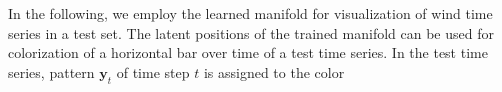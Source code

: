 \documentclass[10pt, conference, compsocconf]{IEEEtran}
\begin{document}
In the following, we employ the learned manifold for visualization of wind time series in a test set. The latent positions of the trained manifold can be used for colorization of a horizontal bar over time of a test time series. In the test time series, pattern $\mathbf{y}_t$ of time step $t$ is assigned to the color 
\begin{figure}[h]
\begin{center}

\end{center}
\end{figure}
\end{document}
